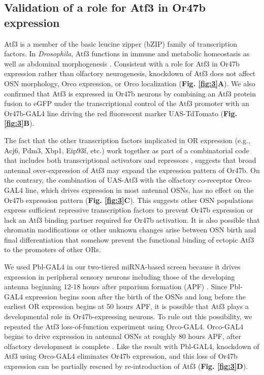\subsection*{Validation of a role for Atf3 in Or47b expression}

Atf3 is a member of the basic leucine zipper (bZIP) family of transcription factors.
In \emph{Drosophila}, Atf3 functions in immune and metabolic homeostasis as well as abdominal morphogenesis \cite{Brodesser_Jindra_Uhlirova_2012,a_Bohmann_Jindra_Uhlirova_2009}.
Consistent with a role for Atf3 in Or47b expression rather than olfactory neurogenesis, knockdown of Atf3 does not affect OSN morphology, Orco expression, or Orco localization (\textbf{Fig. \ref{fig:3}A}).
We also confirmed that Atf3 is expressed in Or47b neurons by combining an Atf3 protein fusion to eGFP under the transcriptional control of the Atf3 promoter with an Or47b-GAL4 line driving the red fluorescent marker UAS-TdTomato (\textbf{Fig. \ref{fig:3}B}).

The fact that the other transcription factors implicated in OR expression (e.g., Acj6, Pdm3, Xbp1, Eip93f, etc.) work together as part of a combinatorial code that includes both transcriptional activators and repressors \cite{Brochtrup_Hummel_Alenius_2012}, suggests that broad antennal over-expression of Atf3 may expand the expression pattern of Or47b.
On the contrary, the combination of UAS-Atf3 with the olfactory co-receptor Orco-GAL4 line, which drives expression in most antennal OSNs, has no effect on the Or47b expression pattern (\textbf{Fig. \ref{fig:3}C}).
This suggests other OSN populations express sufficient repressive transcription factors to prevent Or47b expression or lack an Atf3 binding partner required for Or47b activation.
It is also possible that chromatin modifications or other unknown changes arise between OSN birth and final differentiation that somehow prevent the functional binding of ectopic Atf3 to the promoters of other ORs.

We used Pbl-GAL4 in our two-tiered miRNA-based screen because it drives expression in peripheral sensory neurons including those of the developing antenna beginning 12-18 hours after puparium formation (APF) \cite{dnik_Dickson_Luo_Komiyama_2007}.
Since Pbl-GAL4 expression begins soon after the birth of the OSNs and long before the earliest OR expression begins at 50 hours APF, it is possible that Atf3 plays a developmental role in Or47b-expressing neurons.
To rule out this possibility, we repeated the Atf3 loss-of-function experiment using Orco-GAL4.
Orco-GAL4 begins to drive expression in antennal OSNs at roughly 80 hours APF, after olfactory development is complete \cite{s_Chiappe_Amrein_Vosshall_2004}.
Like the result with Pbl-GAL4, knockdown of Atf3 using Orco-GAL4 eliminates Or47b expression, and this loss of Or47b expression can be partially rescued by re-introduction of Atf3 (\textbf{Fig. \ref{fig:3}D}).